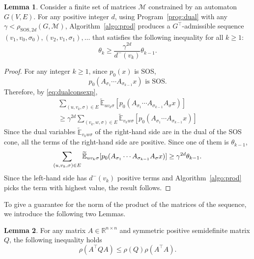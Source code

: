 \documentclass{sig-alternate-05-2015}
\newcommand{\1}{\mathbf{1}}
\newcommand{\din}{d^{-}}
\theoremstyle{definition}
\newtheorem{mylemm}{Lemma}
\newcommand{\R}{\mathbb{R}}
\newcommand{\Tr}{\top}
\newcommand{\A}{\mathcal{M}}
\newcommand{\G}{G}
\newcommand{\jsrsos}[1][2d]{\rho_{\mathrm{SOS},#1}(\G,\A)}
\newcommand{\pE}{\widetilde{\mathbb{E}}}
\newcommand{\Nodes}{V}
\newcommand{\Arcs}{E}
\newcommand{\defAGe  }{a finite set of matrices $\A$ constrained by an automaton $\G(\Nodes,\Arcs)$}
\begin{document}
\begin{mylemm}
  \label{lemm:maxdegpath}
  Consider \defAGe{}.
  For any positive integer $d$,
  using Program~\ref{prog:dual} with any $\gamma < \jsrsos$,
  Algorithm~\ref{algo:prod} produces a $\G^\Tr $-admissible sequence
  $(v_1,v_0,\sigma_0), (v_2,v_1,\sigma_1), \ldots$ %
  that satisfies the following inequality for all $k \geq 1$:
  \begin{equation*}
    \theta_{k}
    \geq \frac{\gamma^{2d}}{\din(v_k)}
    \theta_{k-1}.
  \end{equation*}
  \begin{proof}
    For any integer $k \geq 1$, since $p_0(x)$ is SOS,
    \[ p_0(A_{\sigma_1} \cdots A_{\sigma_{k-1}}x) \text{ is SOS.} \]
    Therefore, by \eqref{eq:dualconsexp},
    \begin{multline*}
      \sum_{(u,v_k,\sigma) \in \Arcs} \pE_{uv_k\sigma}[p_0(A_{\sigma_1} \cdots A_{\sigma_{k-1}} A_\sigma x)]\\
      \geq \gamma^{2d} \sum_{(v_k,w,\sigma) \in \Arcs} \pE_{v_kw\sigma}[p_0(A_{\sigma_1} \cdots A_{\sigma_{k-1}} x)]
    \end{multline*}
    Since the dual variables $\pE_{v_kw\sigma}$ of the right-hand side are in the dual of the SOS cone,
    all the terms of the right-hand side are positive.
    Since one of them is $\theta_{k-1}$,
    \[
      \sum_{(u,v_k,\sigma) \in \Arcs} \pE_{uv_k\sigma}[p_0(A_{\sigma_1} \cdots A_{\sigma_{k-1}} A_\sigma x)]\\
      \geq \gamma^{2d} \theta_{k-1}.
    \]
    Since the left-hand side has $\din(v_k)$ positive terms and
    Algorithm~\ref{algo:prod} picks the term with highest value, the result follows.
  \end{proof}
\end{mylemm}

To give a guarantee for the norm of the product of the matrices of the sequence,
we introduce the following two Lemmas.

\begin{mylemm}
  \label{lemm:svd}
  For any matrix $A \in \R^{n \times n}$ and symmetric positive semidefinite matrix $Q$,
  the following inequality holds
  \[ \rho(A^\Tr QA) \leq \rho(Q) \rho(A^\Tr A). \]
\end{mylemm}
\end{document}
